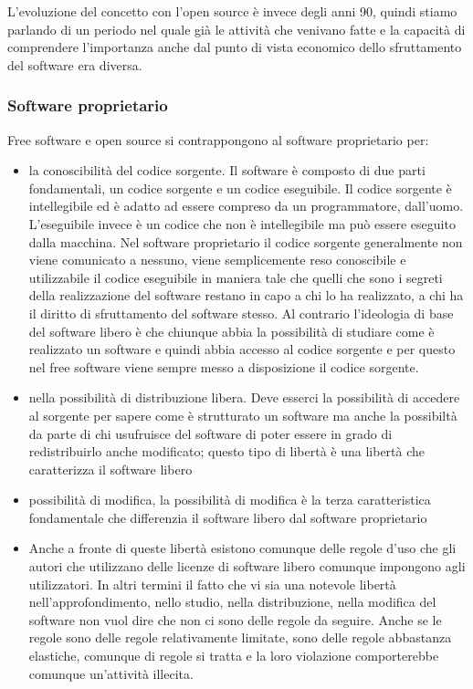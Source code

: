 L'evoluzione del concetto con l'open source è invece degli anni 90, quindi stiamo parlando di un periodo nel quale già le attività che venivano fatte e la capacità di comprendere l'importanza anche dal punto di vista economico dello sfruttamento del software era diversa. 

\subsubsection{Software proprietario}
Free software e open source si contrappongono al software proprietario per:
\begin{itemize}
    \item la conoscibilità del codice sorgente. Il software è composto di due parti fondamentali, un codice sorgente e un codice eseguibile. Il codice sorgente è intellegibile ed è adatto ad essere compreso da un programmatore, dall'uomo. L'eseguibile invece è un codice che non è intellegibile ma può essere eseguito dalla macchina. Nel software proprietario il codice sorgente generalmente non viene comunicato a nessuno, viene semplicemente reso conoscibile e utilizzabile il codice eseguibile in maniera tale che quelli che sono i segreti della realizzazione del software restano in capo a chi lo ha realizzato, a chi ha il diritto di sfruttamento del software stesso. Al contrario l'ideologia di base del software libero è che chiunque abbia la possibilità di studiare come è realizzato un software e quindi abbia accesso al codice sorgente e per questo nel free software viene sempre messo a disposizione il codice sorgente.
    \item nella possibilità di distribuzione libera. Deve esserci la possibilità di accedere al sorgente per sapere come è strutturato un software ma anche la possibiltà da parte di chi usufruisce del software di poter essere in grado di redistribuirlo anche modificato; questo tipo di libertà è una libertà che caratterizza il software libero
    \item possibilità di modifica, la possibilità di modifica è la terza caratteristica fondamentale che differenzia il software libero dal software proprietario
    \item Anche a fronte di queste libertà esistono comunque delle regole d'uso che gli autori che utilizzano delle licenze di software libero comunque impongono agli utilizzatori. In altri termini il fatto che vi sia una notevole libertà nell'approfondimento, nello studio, nella distribuzione, nella modifica del software non vuol dire che non ci sono delle regole da seguire. Anche se le regole sono delle regole relativamente limitate, sono delle regole abbastanza elastiche, comunque di regole si tratta e la loro violazione comporterebbe comunque un'attività illecita.
\end{itemize}

